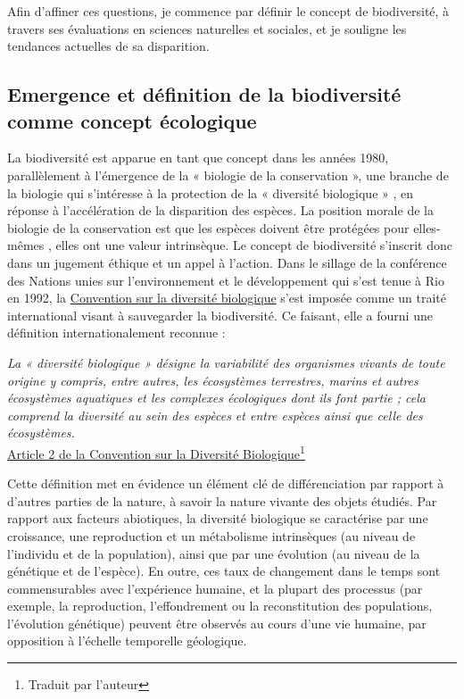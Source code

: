 Afin d'affiner ces questions, je commence par définir le concept de biodiversité, à travers ses évaluations en sciences naturelles et sociales, et je souligne les tendances actuelles de sa disparition.

{}
\subsection*{Emergence et définition de la biodiversité comme concept écologique }


La biodiversité est apparue en tant que concept dans les années 1980, parallèlement à l'émergence de la « biologie de la conservation », une branche de la biologie qui s'intéresse à la protection de la « diversité biologique » \citep{soule_what_1985}, en réponse à l'accélération de la disparition des espèces. La position morale de la biologie de la conservation est que les espèces doivent être protégées pour elles-mêmes \citep{soule_conservation_1986}, elles ont une valeur intrinsèque. 
Le concept de biodiversité s'inscrit donc dans un jugement éthique et un appel à l'action. Dans le sillage de la conférence des Nations unies sur l'environnement et le développement qui s'est tenue à Rio en 1992, la \href{https://www.cbd.int/}{Convention sur la diversité biologique} s'est imposée comme un traité international visant à sauvegarder la biodiversité. Ce faisant, elle a fourni une définition internationalement reconnue :

\begin{displayquote}
\textit{La « diversité biologique » désigne la variabilité des organismes vivants de toute origine y compris, entre autres, les écosystèmes terrestres, marins et autres écosystèmes aquatiques et les complexes écologiques dont ils font partie ; cela comprend la diversité au sein des espèces et entre espèces ainsi que celle des écosystèmes.}\\
\hspace*{\fill} \small{\href{https://www.cbd.int/convention/articles/default.shtml?a=cbd-02}{Article 2 de la Convention sur la Diversité Biologique}}\footnote{Traduit par l'auteur}
\end{displayquote}

Cette définition met en évidence un élément clé de différenciation par rapport à d'autres parties de la nature, à savoir la nature vivante des objets étudiés. Par rapport aux facteurs abiotiques, la diversité biologique se caractérise par une croissance, une reproduction et un métabolisme intrinsèques (au niveau de l'individu et de la population), ainsi que par une évolution (au niveau de la génétique et de l'espèce). En outre, ces taux de changement dans le temps sont commensurables avec l'expérience humaine, et la plupart des processus (par exemple, la reproduction, l'effondrement ou la reconstitution des populations, l'évolution génétique) peuvent être observés au cours d'une vie humaine, par opposition à l'échelle temporelle géologique. 

